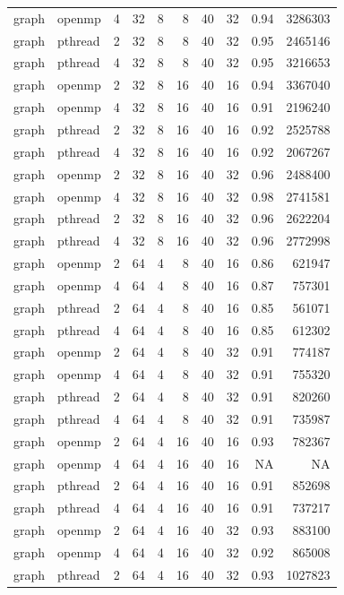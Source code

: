 \documentclass[a4paper]{article}
\begin{document}
{\begin{longtable}{lllrrrrrrr}
graph & openmp & 4 & 32 & 8 & 8 & 40 & 32 & 0.94 & 3286303 \\
graph & pthread & 2 & 32 & 8 & 8 & 40 & 32 & 0.95 & 2465146 \\
graph & pthread & 4 & 32 & 8 & 8 & 40 & 32 & 0.95 & 3216653 \\
graph & openmp & 2 & 32 & 8 & 16 & 40 & 16 & 0.94 & 3367040 \\
graph & openmp & 4 & 32 & 8 & 16 & 40 & 16 & 0.91 & 2196240 \\
graph & pthread & 2 & 32 & 8 & 16 & 40 & 16 & 0.92 & 2525788 \\
graph & pthread & 4 & 32 & 8 & 16 & 40 & 16 & 0.92 & 2067267 \\
graph & openmp & 2 & 32 & 8 & 16 & 40 & 32 & 0.96 & 2488400 \\
graph & openmp & 4 & 32 & 8 & 16 & 40 & 32 & 0.98 & 2741581 \\
graph & pthread & 2 & 32 & 8 & 16 & 40 & 32 & 0.96 & 2622204 \\
graph & pthread & 4 & 32 & 8 & 16 & 40 & 32 & 0.96 & 2772998 \\
graph & openmp & 2 & 64 & 4 & 8 & 40 & 16 & 0.86 & 621947 \\
graph & openmp & 4 & 64 & 4 & 8 & 40 & 16 & 0.87 & 757301 \\
graph & pthread & 2 & 64 & 4 & 8 & 40 & 16 & 0.85 & 561071 \\
graph & pthread & 4 & 64 & 4 & 8 & 40 & 16 & 0.85 & 612302 \\
graph & openmp & 2 & 64 & 4 & 8 & 40 & 32 & 0.91 & 774187 \\
graph & openmp & 4 & 64 & 4 & 8 & 40 & 32 & 0.91 & 755320 \\
graph & pthread & 2 & 64 & 4 & 8 & 40 & 32 & 0.91 & 820260 \\
graph & pthread & 4 & 64 & 4 & 8 & 40 & 32 & 0.91 & 735987 \\
graph & openmp & 2 & 64 & 4 & 16 & 40 & 16 & 0.93 & 782367 \\
graph & openmp & 4 & 64 & 4 & 16 & 40 & 16 & NA & NA \\
graph & pthread & 2 & 64 & 4 & 16 & 40 & 16 & 0.91 & 852698 \\
graph & pthread & 4 & 64 & 4 & 16 & 40 & 16 & 0.91 & 737217 \\
graph & openmp & 2 & 64 & 4 & 16 & 40 & 32 & 0.93 & 883100 \\
graph & openmp & 4 & 64 & 4 & 16 & 40 & 32 & 0.92 & 865008 \\
graph & pthread & 2 & 64 & 4 & 16 & 40 & 32 & 0.93 & 1027823 \\

\end{longtable}}
\end{document}
